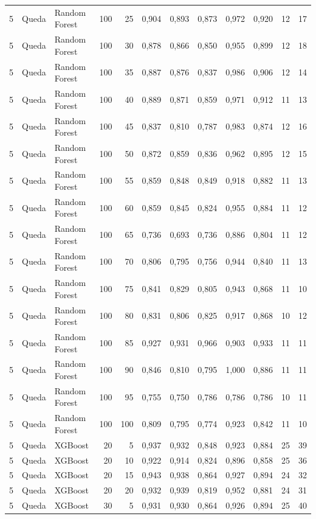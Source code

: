 \begin{longtable}{@{}rllrrrrrrrrr@{}}
5 & Queda & Random Forest & 100 & 25 & 0,904 & 0,893 & 0,873 & 0,972 & 0,920 & 12 & 17 \\
5 & Queda & Random Forest & 100 & 30 & 0,878 & 0,866 & 0,850 & 0,955 & 0,899 & 12 & 18 \\
5 & Queda & Random Forest & 100 & 35 & 0,887 & 0,876 & 0,837 & 0,986 & 0,906 & 12 & 14 \\
5 & Queda & Random Forest & 100 & 40 & 0,889 & 0,871 & 0,859 & 0,971 & 0,912 & 11 & 13 \\
5 & Queda & Random Forest & 100 & 45 & 0,837 & 0,810 & 0,787 & 0,983 & 0,874 & 12 & 16 \\
5 & Queda & Random Forest & 100 & 50 & 0,872 & 0,859 & 0,836 & 0,962 & 0,895 & 12 & 15 \\
5 & Queda & Random Forest & 100 & 55 & 0,859 & 0,848 & 0,849 & 0,918 & 0,882 & 11 & 13 \\
5 & Queda & Random Forest & 100 & 60 & 0,859 & 0,845 & 0,824 & 0,955 & 0,884 & 11 & 12 \\
5 & Queda & Random Forest & 100 & 65 & 0,736 & 0,693 & 0,736 & 0,886 & 0,804 & 11 & 12 \\
5 & Queda & Random Forest & 100 & 70 & 0,806 & 0,795 & 0,756 & 0,944 & 0,840 & 11 & 13 \\
5 & Queda & Random Forest & 100 & 75 & 0,841 & 0,829 & 0,805 & 0,943 & 0,868 & 11 & 10 \\
5 & Queda & Random Forest & 100 & 80 & 0,831 & 0,806 & 0,825 & 0,917 & 0,868 & 10 & 12 \\
5 & Queda & Random Forest & 100 & 85 & 0,927 & 0,931 & 0,966 & 0,903 & 0,933 & 11 & 11 \\
5 & Queda & Random Forest & 100 & 90 & 0,846 & 0,810 & 0,795 & 1,000 & 0,886 & 11 & 11 \\
5 & Queda & Random Forest & 100 & 95 & 0,755 & 0,750 & 0,786 & 0,786 & 0,786 & 10 & 11 \\
5 & Queda & Random Forest & 100 & 100 & 0,809 & 0,795 & 0,774 & 0,923 & 0,842 & 11 & 10 \\
5 & Queda & XGBoost & 20 & 5 & 0,937 & 0,932 & 0,848 & 0,923 & 0,884 & 25 & 39 \\
5 & Queda & XGBoost & 20 & 10 & 0,922 & 0,914 & 0,824 & 0,896 & 0,858 & 25 & 36 \\
5 & Queda & XGBoost & 20 & 15 & 0,943 & 0,938 & 0,864 & 0,927 & 0,894 & 24 & 32 \\
5 & Queda & XGBoost & 20 & 20 & 0,932 & 0,939 & 0,819 & 0,952 & 0,881 & 24 & 31 \\
5 & Queda & XGBoost & 30 & 5 & 0,931 & 0,930 & 0,864 & 0,926 & 0,894 & 25 & 40 \\

\end{longtable}
